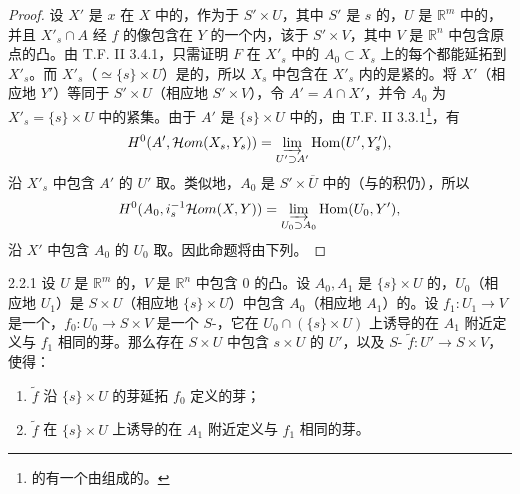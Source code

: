 \begin{proof}
设 $X'$ 是 $x$ 在 $X$ 中的，作为于 $S'\times U$，其中 $S'$ 是 $s$ 的，$U$ 是 $\mathbb R^m$ 中的，并且 $X'_s\cap A$ 经 $f$ 的像包含在 $Y$ 的一个内，该于 $S'\times V$，其中 $V$ 是 $\mathbb R^n$ 中包含原点的凸。由 T.F. II 3.4.1，只需证明 $F$ 在 $X'_s$ 中的 $A_0\subset X_s$ 上的每个都能延拓到 $X'_s$。而 $X'_s$（$\simeq\{s\}\times U$）是的，所以 $X_s$ 中包含在 $X'_s$ 内的是紧的。将 $X'$（相应地 $Y'$）等同于 $S'\times U$（相应地 $S'\times V$），令 $A'=A\cap X'$，并令 $A_0$ 为 $X'_s=\{s\}\times U$ 中的紧集。由于 $A'$ 是 $\{s\}\times U$ 中的，由 T.F. II 3.3.1\footnote{的有一个由组成的。}，有
\[H^0(A',\mathcal Hom(X_s,Y_s))=\varinjlim_{U'\supset A'}\operatorname{Hom}(U',Y'_s),\]
沿 $X'_s$ 中包含 $A'$ 的 $U'$ 取。类似地，$A_0$ 是 $S'\times\overline U$ 中的（与的积仍），所以
\[H^0(A_0,i_s^{-1}\mathcal Hom(X,Y))=\varinjlim_{U_0\supset A_0}\operatorname{Hom}(U_0,Y'),\]
沿 $X'$ 中包含 $A_0$ 的 $U_0$ 取。因此命题将由下列。
\end{proof}
\begin{SGAresult}{}{2.2.1}
设 $U$ 是 $\mathbb R^m$ 的，$V$ 是 $\mathbb R^n$ 中包含 $0$ 的凸。设 $A_0,A_1$ 是 $\{s\}\times U$ 的，$U_0$（相应地 $U_1$）是 $S\times U$（相应地 $\{s\}\times U$）中包含 $A_0$（相应地 $A_1$）的。设 $f_1:U_1\to V$ 是一个，$f_0:U_0\to S\times V$ 是一个 $S$-，它在 $U_0\cap(\{s\}\times U)$ 上诱导的在 $A_1$ 附近定义与 $f_1$ 相同的芽。那么存在 $S\times U$ 中包含 $s\times U$ 的 $U'$，以及 $S$- $\widetilde f:U'\to S\times V$，使得：
\begin{enumerate}
\item[(i)] $\widetilde f$ 沿 $\{s\}\times U$ 的芽延拓 $f_0$ 定义的芽；
\item[(ii)] $\widetilde f$ 在 $\{s\}\times U$ 上诱导的在 $A_1$ 附近定义与 $f_1$ 相同的芽。
\end{enumerate}
\end{SGAresult}
